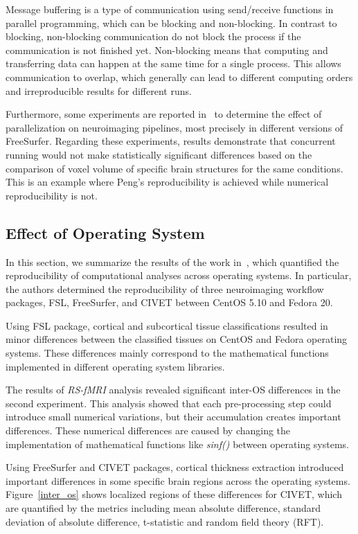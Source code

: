 Message buffering is a type of communication using send/receive 
functions in parallel programming, which can be blocking and 
non-blocking. In contrast to blocking, non-blocking communication do 
not block the process if the communication is not finished yet. 
Non-blocking means that computing and transferring data can happen at 
the same time for a single process. This allows communication to 
overlap, which generally can lead to different computing orders and 
irreproducible results for different runs. 

Furthermore, some experiments are reported in~\cite{Gronenschild2012} 
to determine the effect of parallelization on neuroimaging pipelines, 
most precisely in different versions of FreeSurfer. Regarding these 
experiments, results demonstrate that concurrent running would not make 
statistically significant differences based on the comparison of voxel 
volume of specific brain structures for the same conditions. This is an 
example where Peng's reproducibility is achieved while numerical 
reproducibility is not.

\subsection{Effect of Operating System}

In this section, we summarize the results of the work in~\cite{Glatard2015}, 
which quantified the reproducibility of computational analyses 
across operating systems. In particular, the authors determined 
the reproducibility of three neuroimaging workflow packages, FSL, 
FreeSurfer, and CIVET between CentOS 5.10 and Fedora 20. 

Using FSL package, cortical and subcortical tissue classifications 
resulted in minor differences between the classified tissues on CentOS 
and Fedora operating systems. These differences mainly correspond to 
the mathematical functions implemented in different operating system 
libraries. 

The results of \emph{RS-fMRI} analysis revealed significant inter-OS 
differences in the second experiment. This analysis showed that each 
pre-processing step could introduce small numerical variations, but their 
accumulation creates important differences. These numerical differences 
are caused by changing the implementation of mathematical functions like 
\emph{sinf()} between operating systems.  

Using FreeSurfer and CIVET packages, cortical thickness extraction 
introduced important differences in some specific brain regions across 
the operating systems. Figure~\ref{inter_os} shows localized regions of 
these differences for CIVET, which are quantified by the metrics 
including mean absolute difference, standard deviation of absolute 
difference, t-statistic and random field theory (RFT). 

